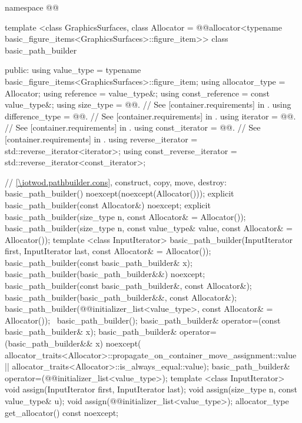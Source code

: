 \begin{codeblock}
namespace @\fullnamespace{}@ {
  template <class GraphicsSurfaces,
            class Allocator = @\stdqualifier{}@allocator<typename
              basic_figure_items<GraphicsSurfaces>::figure_item>>
  class basic_path_builder {
  public:
    using value_type             = typename basic_figure_items<GraphicsSurfaces>::figure_item;
    using allocator_type         = Allocator;
    using reference              = value_type&;
    using const_reference        = const value_type&;
    using size_type              = @@. // See [container.requirements] in \CppXVII.
    using difference_type        = @@. // See [container.requirements] in \CppXVII.
    using iterator               = @@. // See [container.requirements] in \CppXVII.
    using const_iterator         = @@. // See [container.requirements] in \CppXVII.
    using reverse_iterator       = std::reverse_iterator<iterator>;
    using const_reverse_iterator = std::reverse_iterator<const_iterator>;

    // \ref{\iotwod.pathbuilder.cons}, construct, copy, move, destroy:
    basic_path_builder() noexcept(noexcept(Allocator()));
    explicit basic_path_builder(const Allocator&) noexcept;
    explicit basic_path_builder(size_type n, const Allocator& = Allocator());
    basic_path_builder(size_type n, const value_type& value, const Allocator& = Allocator());
    template <class InputIterator>
    basic_path_builder(InputIterator first, InputIterator last, const Allocator& = Allocator());
    basic_path_builder(const basic_path_builder& x);
    basic_path_builder(basic_path_builder&&) noexcept;
    basic_path_builder(const basic_path_builder&, const Allocator&);
    basic_path_builder(basic_path_builder&&, const Allocator&);
    basic_path_builder(@\stdqualifier{}@initializer_list<value_type>, const Allocator& = Allocator());
    ~basic_path_builder();
    basic_path_builder& operator=(const basic_path_builder& x);
    basic_path_builder& operator=(basic_path_builder&& x) noexcept(
      allocator_traits<Allocator>::propagate_on_container_move_assignment::value ||
      allocator_traits<Allocator>::is_always_equal::value);
    basic_path_builder& operator=(@\stdqualifier{}@initializer_list<value_type>);
    template <class InputIterator>
    void assign(InputIterator first, InputIterator last);
    void assign(size_type n, const value_type& u);
    void assign(@\stdqualifier{}@initializer_list<value_type>);
    allocator_type get_allocator() const noexcept;

}}
\end{codeblock}
